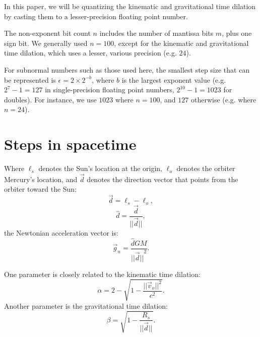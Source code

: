\documentclass[12pt]{article}
\begin{document}
In this paper, we will be quantizing the kinematic and gravitational time dilation by casting them to a lesser-precision floating point number.

The non-exponent bit count $n$ includes the number of mantissa bits $m$, plus one sign bit.
We generally used $n = 100$, except for the kinematic and gravitational time dilation, which uses a lesser, various precision (e.g. $24$).

For subnormal numbers such as those used here, the smallest step size that can be represented is $\epsilon = 2 \times 2^{-b}$, where $b$ is the largest exponent value (e.g. $2^7 - 1 = 127$ in single-precision floating point numbers, $2^{10} - 1 = 1023$ for doubles).
For instance, we use $1023$ where $n = 100$, and $127$ otherwise (e.g. where $n = 24$).





\section{Steps in spacetime}

Where $\ell_s$ denotes the Sun's location at the origin, $\ell_o$ denotes the orbiter Mercury's location, and $\vec{d}$ denotes the direction vector that points from the orbiter toward the Sun:
\begin{equation}
\label{direction_vector}
\vec{d} = \ell_{s} - \ell_{o},	
\end{equation}
\begin{equation}
\label{direction_unit_vector}
\hat{d} = \frac{\vec{d}}{\lvert\lvert \vec{d} \rvert\rvert},
\end{equation}
the Newtonian acceleration vector is:
\begin{equation}
\label{newton}
\vec{g}_n = \frac{\hat{d} G M}{{\lvert\lvert \vec{d} \rvert\rvert}^2}.
\end{equation}

One parameter is closely related to the kinematic time dilation:
\begin{equation}
\label{eq_kinematic}
\alpha = 2 - \sqrt{1 - \frac{\lvert\lvert \vec{v}_{o}\rvert\rvert^2}{c^2}}.
\end{equation}
Another parameter is the gravitational time dilation:
\begin{equation}
\label{eq_gravitational}
\beta = \sqrt{1 - \frac{R_{s}}{\lvert \lvert \vec{d} \rvert \rvert}}.
\end{equation}
\end{document}
